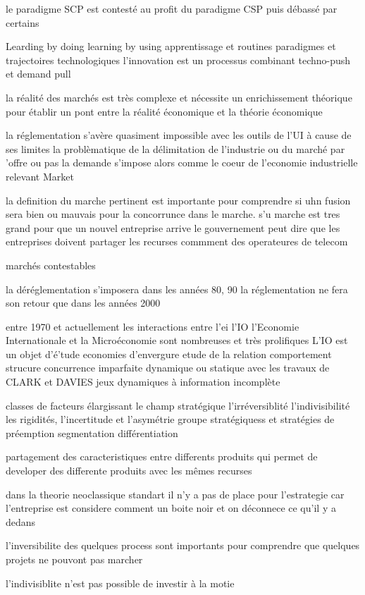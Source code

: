 \documentclass{article}
\begin{document}
le paradigme SCP est contesté au profit du paradigme CSP puis débassé par certains

Learding by doing learning by using apprentissage et routines paradigmes et trajectoires technologiques
l'innovation est un processus combinant techno-push et demand pull

la réalité des marchés est très complexe et nécessite un enrichissement théorique pour établir un pont entre la réalité économique et la théorie économique

la réglementation s'avère quasiment impossible avec les outils de l'UI à cause de ses limites la problèmatique de la délimitation de l'industrie ou du marché par 'offre ou pas la demande s'impose alors comme le coeur de l'economie industrielle relevant Market

la definition du marche pertinent est importante pour comprendre si uhn fusion sera bien ou mauvais pour la concorrunce dans le marche. s'u marche est tres grand pour que un nouvel entreprise arrive le gouvernement peut  dire que les entreprises doivent partager les recurses commment des operateures de telecom

marchés contestables 

la déréglementation s'imposera dans les années 80, 90
la réglementation ne fera son retour que dans les années 2000


entre 1970 et actuellement les interactions entre l'ei l'IO l'Economie Internationale et la Microéconomie sont nombreuses et très prolifiques
L'IO est un objet d'é'tude economies d'envergure
etude de la relation comportement strucure concurrence imparfaite dynamique ou statique avec les travaux de CLARK et DAVIES jeux dynamiques à information incomplète

classes de facteurs élargissant le champ stratégique l'irréversiblité l'indivisibilité les rigidités, l'incertitude et l'asymétrie groupe stratégiquess et stratégies de préemption segmentation différentiation

partagement des caracteristiques entre differents produits qui permet de developer des differente produits avec les mêmes recurses


dans la theorie neoclassique standart il n'y a pas de place pour l'estrategie car l'entreprise est considere comment un boite noir et on déconnece ce qu'il y a dedans

l'inversibilite des quelques process sont importants pour comprendre que quelques projets ne pouvont pas marcher

l'indivisiblite n'est pas possible de investir à la motie
\end{document}
